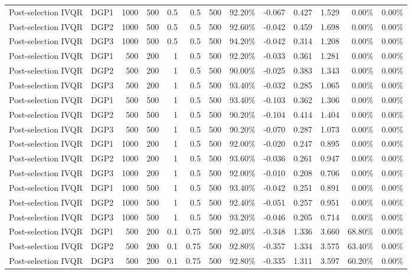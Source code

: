 \begin{landscape}
\begin{longtable}{llrrrrrrrrrrr}
Post-selection IVQR & DGP1 & 1000 & 500 & 0.5 & 0.5 & 500 & 92.20\% & -0.067 & 0.427 & 1.529 & 0.00\% & 0.00\% \\
Post-selection IVQR & DGP2 & 1000 & 500 & 0.5 & 0.5 & 500 & 92.60\% & -0.042 & 0.459 & 1.698 & 0.00\% & 0.00\% \\
Post-selection IVQR & DGP3 & 1000 & 500 & 0.5 & 0.5 & 500 & 94.20\% & -0.042 & 0.314 & 1.208 & 0.00\% & 0.00\% \\
Post-selection IVQR & DGP1 & 500 & 200 & 1 & 0.5 & 500 & 92.20\% & -0.033 & 0.361 & 1.281 & 0.00\% & 0.00\% \\
Post-selection IVQR & DGP2 & 500 & 200 & 1 & 0.5 & 500 & 90.00\% & -0.025 & 0.383 & 1.343 & 0.00\% & 0.00\% \\
Post-selection IVQR & DGP3 & 500 & 200 & 1 & 0.5 & 500 & 93.40\% & -0.032 & 0.285 & 1.065 & 0.00\% & 0.00\% \\
Post-selection IVQR & DGP1 & 500 & 500 & 1 & 0.5 & 500 & 93.40\% & -0.103 & 0.362 & 1.306 & 0.00\% & 0.00\% \\
Post-selection IVQR & DGP2 & 500 & 500 & 1 & 0.5 & 500 & 90.20\% & -0.104 & 0.414 & 1.404 & 0.00\% & 0.00\% \\
Post-selection IVQR & DGP3 & 500 & 500 & 1 & 0.5 & 500 & 90.20\% & -0.070 & 0.287 & 1.073 & 0.00\% & 0.00\% \\
Post-selection IVQR & DGP1 & 1000 & 200 & 1 & 0.5 & 500 & 92.00\% & -0.020 & 0.247 & 0.895 & 0.00\% & 0.00\% \\
Post-selection IVQR & DGP2 & 1000 & 200 & 1 & 0.5 & 500 & 93.60\% & -0.036 & 0.261 & 0.947 & 0.00\% & 0.00\% \\
Post-selection IVQR & DGP3 & 1000 & 200 & 1 & 0.5 & 500 & 92.00\% & -0.010 & 0.208 & 0.706 & 0.00\% & 0.00\% \\
Post-selection IVQR & DGP1 & 1000 & 500 & 1 & 0.5 & 500 & 93.40\% & -0.042 & 0.251 & 0.891 & 0.00\% & 0.00\% \\
Post-selection IVQR & DGP2 & 1000 & 500 & 1 & 0.5 & 500 & 92.40\% & -0.051 & 0.257 & 0.951 & 0.00\% & 0.00\% \\
Post-selection IVQR & DGP3 & 1000 & 500 & 1 & 0.5 & 500 & 93.20\% & -0.046 & 0.205 & 0.714 & 0.00\% & 0.00\% \\
Post-selection IVQR & DGP1 & 500 & 200 & 0.1 & 0.75 & 500 & 92.40\% & -0.348 & 1.336 & 3.660 & 68.80\% & 0.00\% \\
Post-selection IVQR & DGP2 & 500 & 200 & 0.1 & 0.75 & 500 & 92.80\% & -0.357 & 1.334 & 3.575 & 63.40\% & 0.00\% \\
Post-selection IVQR & DGP3 & 500 & 200 & 0.1 & 0.75 & 500 & 92.80\% & -0.335 & 1.311 & 3.597 & 60.20\% & 0.00\% \\

\end{longtable}
\end{landscape}
